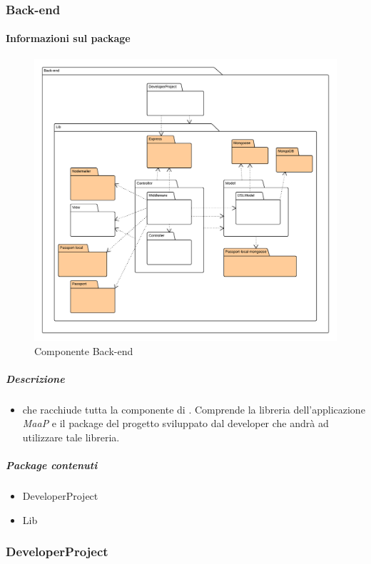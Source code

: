
  \subsubsection{Back-end}
  \paragraph{Informazioni sul package} 
    \begin{figure}[H] 
      \begin{center} 
        \includegraphics[width=\textwidth]{packages/Back-end.png}  
        \caption{Componente Back-end}
      \end{center}  
    \end{figure} 
  \subparagraph{Descrizione} 
    \begin{itemize}
    \item[]  che racchiude tutta la componente di . Comprende la libreria dell'applicazione \textit{MaaP} e il package del progetto sviluppato dal developer che andrà ad utilizzare tale libreria.
    \end{itemize} 
    \subparagraph{Package contenuti} 
    \begin{itemize}
        \item DeveloperProject
        \item Lib
    \end{itemize}
  \subsubsection{DeveloperProject}
